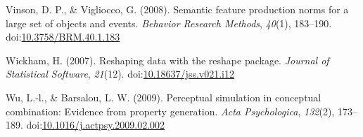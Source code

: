 \documentclass[english,,man]{apa6}
\begin{document}
\leavevmode\hypertarget{ref-Vinson2008}{}%
Vinson, D. P., \& Vigliocco, G. (2008). Semantic feature production norms for a large set of objects and events. \emph{Behavior Research Methods}, \emph{40}(1), 183--190. doi:\href{https://doi.org/10.3758/BRM.40.1.183}{10.3758/BRM.40.1.183}

\leavevmode\hypertarget{ref-Wickham2007}{}%
Wickham, H. (2007). Reshaping data with the reshape package. \emph{Journal of Statistical Software}, \emph{21}(12). doi:\href{https://doi.org/10.18637/jss.v021.i12}{10.18637/jss.v021.i12}

\leavevmode\hypertarget{ref-Wu2009}{}%
Wu, L.-l., \& Barsalou, L. W. (2009). Perceptual simulation in conceptual combination: Evidence from property generation. \emph{Acta Psychologica}, \emph{132}(2), 173--189. doi:\href{https://doi.org/10.1016/j.actpsy.2009.02.002}{10.1016/j.actpsy.2009.02.002}
\end{document}
